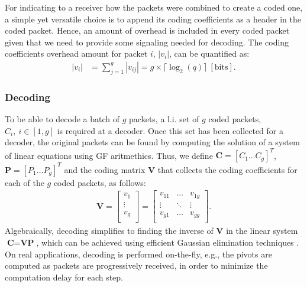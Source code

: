 For indicating to a receiver how the packets were combined
to create a coded one, a simple yet versatile choice is to append
its coding coefficients as a header in the coded packet. Hence, an
amount of overhead is included in every coded packet given that we
need to provide some signaling needed for decoding. The coding
coefficients overhead amount for packet $i$, $|v_i|$, can be quantified
as:
%
\begin{align} \label{eq:coded_packet_coef}
|v_i| &= \sum_{j=1}^{g} |v_{ij}| = g \times \lceil \log_{2} (q)
\rceil ~ [\mathrm{bits}].
\end{align}

\subsubsection{Decoding}
\label{sssec:decoding}
To be able to decode a batch of $g$ packets, a \ac{l.i.} set of $g$
coded packets, $C_i,\ i \in [1,g]$ is required at a decoder.
Once this set has been collected for a decoder,
the original packets can be found by computing the solution of a system
of linear equations using \ac{GF} aritmethics. Thus, we define
$\textbf{C} = \left[C_1 \ldots C_g \right]^T$,
$\textbf{P} = \left[P_1 \ldots P_g \right]^T$ and the coding matrix
$\textbf{V}$ that collects the coding coefficients for each of the $g$
coded packets, as follows:
%
\begin{align} \label{eq:coding_matrix}
\textbf{V} =
\left[
\begin{array}{c}
        v_1    \\ \hline
        \vdots \\ \hline
        v_g    \\
\end{array}
\right]
=
\left[
\begin{array}{ccc}
        v_{11} & \ldots & v_{1g} \\
        \vdots  & \ddots & \vdots  \\
        v_{g1} & \ldots & v_{gg} \\
\end{array}
\right].
\end{align}
%
Algebraically, decoding simplifies to finding the inverse of
$\textbf{V}$ in the linear system
$\textbf{C} = \textbf{V} \textbf{P}$, which can be achieved using
efficient Gaussian elimination techniques \cite{fragouli2006network}.
On real applications, decoding is performed on-the-fly, e.g., the
pivots are computed as packets are progressively received, in order to
minimize the computation delay for each step.

